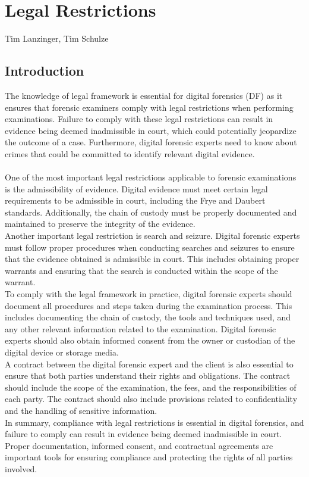 \documentclass{scrreprt}
\begin{document}
\chapter{Legal Restrictions}
Tim Lanzinger, Tim Schulze

\section{Introduction}
The knowledge of legal framework is essential for digital forensics (DF) as it ensures that forensic examiners comply with legal restrictions when performing examinations. Failure to comply with these legal restrictions can result in evidence being deemed inadmissible in court, which could potentially jeopardize the outcome of a case. Furthermore, digital forensic experts need to know about crimes that could be committed to identify relevant digital evidence.
\\\\One of the most important legal restrictions applicable to forensic examinations is the admissibility of evidence. Digital evidence must meet certain legal requirements to be admissible in court, including the Frye and Daubert standards. Additionally, the chain of custody must be properly documented and maintained to preserve the integrity of the evidence.
\\\linebreak Another important legal restriction is search and seizure. Digital forensic experts must follow proper procedures when conducting searches and seizures to ensure that the evidence obtained is admissible in court. This includes obtaining proper warrants and ensuring that the search is conducted within the scope of the warrant.
\\\linebreak To comply with the legal framework in practice, digital forensic experts should document all procedures and steps taken during the examination process. This includes documenting the chain of custody, the tools and techniques used, and any other relevant information related to the examination. Digital forensic experts should also obtain informed consent from the owner or custodian of the digital device or storage media.
\\\linebreak A contract between the digital forensic expert and the client is also essential to ensure that both parties understand their rights and obligations. The contract should include the scope of the examination, the fees, and the responsibilities of each party. The contract should also include provisions related to confidentiality and the handling of sensitive information.
\\\linebreak In summary, compliance with legal restrictions is essential in digital forensics, and failure to comply can result in evidence being deemed inadmissible in court. Proper documentation, informed consent, and contractual agreements are important tools for ensuring compliance and protecting the rights of all parties involved.
\end{document}
